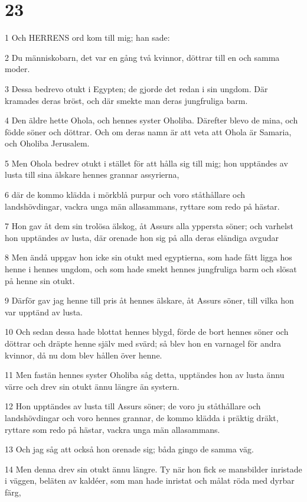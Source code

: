 \chapter{23}

\par 1 Och HERRENS ord kom till mig; han sade:
\par 2 Du människobarn, det var en gång två kvinnor, döttrar till en och samma moder.
\par 3 Dessa bedrevo otukt i Egypten; de gjorde det redan i sin ungdom. Där kramades deras bröst, och där smekte man deras jungfruliga barm.
\par 4 Den äldre hette Ohola, och hennes syster Oholiba. Därefter blevo de mina, och födde söner och döttrar. Och om deras namn är att veta att Ohola är Samaria, och Oholiba Jerusalem.
\par 5 Men Ohola bedrev otukt i stället för att hålla sig till mig; hon upptändes av lusta till sina älskare hennes grannar assyrierna,
\par 6 där de kommo klädda i mörkblå purpur och voro ståthållare och landshövdingar, vackra unga män allasammans, ryttare som redo på hästar.
\par 7 Hon gav åt dem sin trolösa älskog, åt Assurs alla yppersta söner; och varhelst hon upptändes av lusta, där orenade hon sig på alla deras eländiga avgudar
\par 8 Men ändå uppgav hon icke sin otukt med egyptierna, som hade fått ligga hos henne i hennes ungdom, och som hade smekt hennes jungfruliga barm och slösat på henne sin otukt.
\par 9 Därför gav jag henne till pris åt hennes älskare, åt Assurs söner, till vilka hon var upptänd av lusta.
\par 10 Och sedan dessa hade blottat hennes blygd, förde de bort hennes söner och döttrar och dräpte henne själv med svärd; så blev hon en varnagel för andra kvinnor, då nu dom blev hållen över henne.
\par 11 Men fastän hennes syster Oholiba såg detta, upptändes hon av lusta ännu värre och drev sin otukt ännu längre än systern.
\par 12 Hon upptändes av lusta till Assurs söner; de voro ju ståthållare och landshövdingar och voro hennes grannar, de kommo klädda i präktig dräkt, ryttare som redo på hästar, vackra unga män allasammans.
\par 13 Och jag såg att också hon orenade sig; båda gingo de samma väg.
\par 14 Men denna drev sin otukt ännu längre. Ty när hon fick se mansbilder inristade i väggen, beläten av kaldéer, som man hade inristat och målat röda med dyrbar färg,
